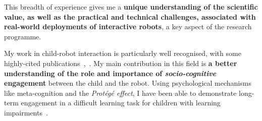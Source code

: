 This breadth of experience gives me a \textbf{unique understanding of the
scientific value, as well as the practical and technical challenges, associated
with real-world deployments of interactive robots}, a key aspect of the research
programme.


My work in child-robot interaction is particularly well recognised, with some
highly-cited publications~\autocite[presented below]{hood2015when, lemaignan2016learning},~\autocite{karim2015review,
kennedy2017child, jacq2016building}. My main contribution in this field is
\textbf{a better understanding of the role and importance of
\emph{socio-cognitive} engagement} between the child and the robot. Using psychological mechanisms
like meta-cognition and the \emph{Protégé effect}, I have been able to
demonstrate long-term engagement in a difficult learning task for children with
learning impairments~\autocite{lemaignan2016learning}.




